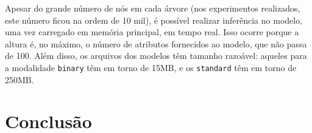 \documentclass[12pt]{article}
\begin{document}
Apesar do grande número de nós em cada árvore (nos experimentos realizados, este número ficou na ordem de 10 mil), é possível realizar inferência no modelo, uma vez carregado em memória principal, em tempo real.
Isso ocorre porque a altura é, no máximo, o número de atributos fornecidos ao modelo, que não passa de 100.
Além disso, os arquivos dos modelos têm tamanho razoável: aqueles para a modalidade \texttt{binary} têm em torno de 15MB, e os \texttt{standard} têm em torno de 250MB.





\section{Conclusão}
\label{sec:conclusion}




\end{document}
